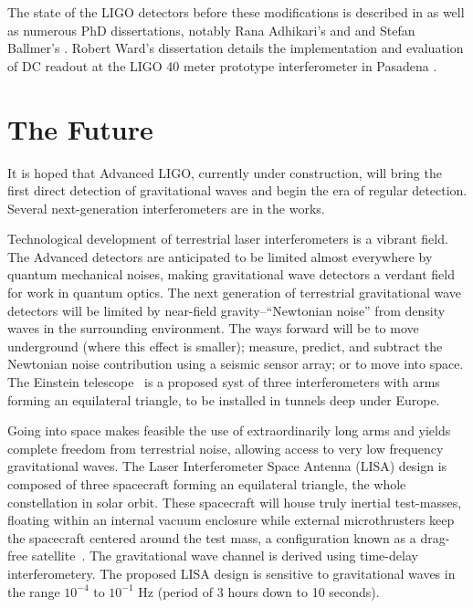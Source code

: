 The state of the LIGO detectors before these modifications is
described in \cite{S5InstrumentPaper} as well as numerous PhD
dissertations, notably Rana Adhikari's \cite{RanaThesis} and and
Stefan Ballmer's \cite{Ballmer2006LIGO}.  Robert Ward's dissertation
details the implementation and evaluation of DC readout at the LIGO 40
meter prototype interferometer in Pasadena \cite{RobWardThesis}.

\section{The Future}

It is hoped that Advanced LIGO, currently under construction, will
bring the first direct detection of gravitational waves and begin the
era of regular detection.
%
Several next-generation interferometers are in the works. 

Technological development of terrestrial laser
interferometers is a vibrant field.  The Advanced detectors are
anticipated to be limited almost everywhere by quantum mechanical
noises, making gravitational wave detectors a verdant field for work
in quantum optics.  The next generation of terrestrial gravitational
wave detectors will be limited by near-field gravity--``Newtonian
noise'' from density waves in the surrounding environment.  The ways
forward will be to move underground (where this effect is smaller);
measure, predict, and subtract the Newtonian noise contribution using
a seismic sensor array; or to move into space.
%
The Einstein telescope~\cite{EinsteinTelescopeDesignStudy2011} is a
proposed syst of three interferometers with arms forming an
equilateral triangle, to be installed in tunnels deep under Europe.

Going into space makes feasible the use of extraordinarily long arms
and yields complete freedom from terrestrial noise, allowing access to
very low frequency gravitational waves.  The Laser Interferometer
Space Antenna (LISA) design is composed of three spacecraft forming an
equilateral triangle, the whole constellation in solar orbit.  These
spacecraft will house truly inertial test-masses, floating within an
internal vacuum enclosure while external microthrusters keep the
spacecraft centered around the test mass, a configuration known as a drag-free satellite~\cite{Lange1964DragFree}.  The gravitational wave
channel is derived using time-delay interferometery.  The proposed
LISA design is sensitive to gravitational waves in the range $10^{-4}$
to $10^{-1}$ Hz (period of 3 hours down to 10 seconds).

